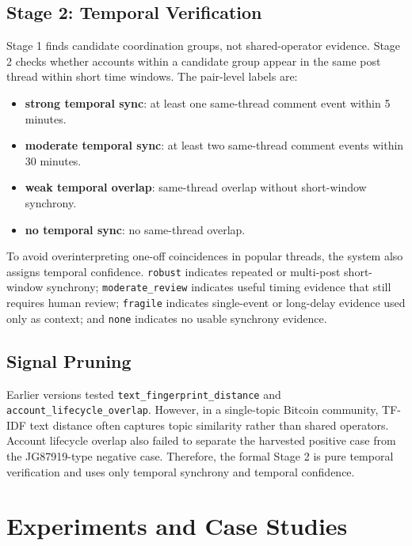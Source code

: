 \documentclass[conference]{IEEEtran}
\begin{document}
\subsection{Stage 2: Temporal Verification}

Stage 1 finds candidate coordination groups, not shared-operator evidence. Stage 2 checks whether accounts within a candidate group appear in the same post thread within short time windows. The pair-level labels are:

\begin{itemize}
  \item \textbf{strong temporal sync}: at least one same-thread comment event within 5 minutes.
  \item \textbf{moderate temporal sync}: at least two same-thread comment events within 30 minutes.
  \item \textbf{weak temporal overlap}: same-thread overlap without short-window synchrony.
  \item \textbf{no temporal sync}: no same-thread overlap.
\end{itemize}

To avoid overinterpreting one-off coincidences in popular threads, the system also assigns temporal confidence. \texttt{robust} indicates repeated or multi-post short-window synchrony; \texttt{moderate\_review} indicates useful timing evidence that still requires human review; \texttt{fragile} indicates single-event or long-delay evidence used only as context; and \texttt{none} indicates no usable synchrony evidence.

\subsection{Signal Pruning}

Earlier versions tested \texttt{text\_fingerprint\_distance} and \texttt{account\_lifecycle\_overlap}. However, in a single-topic Bitcoin community, TF-IDF text distance often captures topic similarity rather than shared operators. Account lifecycle overlap also failed to separate the harvested positive case from the JG87919-type negative case. Therefore, the formal Stage 2 is pure temporal verification and uses only temporal synchrony and temporal confidence.

\section{Experiments and Case Studies}
\end{document}
